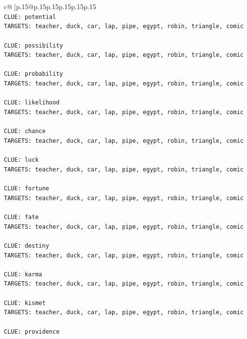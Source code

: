 \documentclass{article}
\begin{document}
{\begin{supertabular}{c@{$\;$}|p{.15\linewidth}@{}p{.15\linewidth}p{.15\linewidth}p{.15\linewidth}p{.15\linewidth}p{.15\linewidth}}
{{{\\ 
\texttt{CLUE: potential} \\
\texttt{TARGETS: teacher, duck, car, lap, pipe, egypt, robin, triangle, comic} \\
\\ 
\texttt{CLUE: possibility} \\
\texttt{TARGETS: teacher, duck, car, lap, pipe, egypt, robin, triangle, comic} \\
\\ 
\texttt{CLUE: probability} \\
\texttt{TARGETS: teacher, duck, car, lap, pipe, egypt, robin, triangle, comic} \\
\\ 
\texttt{CLUE: likelihood} \\
\texttt{TARGETS: teacher, duck, car, lap, pipe, egypt, robin, triangle, comic} \\
\\ 
\texttt{CLUE: chance} \\
\texttt{TARGETS: teacher, duck, car, lap, pipe, egypt, robin, triangle, comic} \\
\\ 
\texttt{CLUE: luck} \\
\texttt{TARGETS: teacher, duck, car, lap, pipe, egypt, robin, triangle, comic} \\
\\ 
\texttt{CLUE: fortune} \\
\texttt{TARGETS: teacher, duck, car, lap, pipe, egypt, robin, triangle, comic} \\
\\ 
\texttt{CLUE: fate} \\
\texttt{TARGETS: teacher, duck, car, lap, pipe, egypt, robin, triangle, comic} \\
\\ 
\texttt{CLUE: destiny} \\
\texttt{TARGETS: teacher, duck, car, lap, pipe, egypt, robin, triangle, comic} \\
\\ 
\texttt{CLUE: karma} \\
\texttt{TARGETS: teacher, duck, car, lap, pipe, egypt, robin, triangle, comic} \\
\\ 
\texttt{CLUE: kismet} \\
\texttt{TARGETS: teacher, duck, car, lap, pipe, egypt, robin, triangle, comic} \\
\\ 
\texttt{CLUE: providence} \\
}}}
\end{supertabular}}
\end{document}
